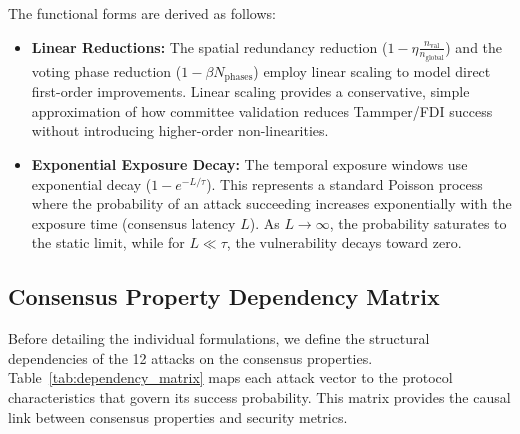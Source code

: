 \documentclass[10pt,twocolumn,journal]{IEEEtran}
\begin{document}
The functional forms are derived as follows:
\begin{itemize}[leftmargin=*]
    \item \textbf{Linear Reductions:} The spatial redundancy reduction ($1 - \eta \frac{n_{\mathrm{val}}}{n_{\mathrm{global}}}$) and the voting phase reduction ($1 - \beta N_{\mathrm{phases}}$) employ linear scaling to model direct first-order improvements. Linear scaling provides a conservative, simple approximation of how committee validation reduces Tammper/FDI success without introducing higher-order non-linearities.
    \item \textbf{Exponential Exposure Decay:} The temporal exposure windows use exponential decay ($1 - e^{-L/\tau}$). This represents a standard Poisson process where the probability of an attack succeeding increases exponentially with the exposure time (consensus latency $L$). As $L \to \infty$, the probability saturates to the static limit, while for $L \ll \tau$, the vulnerability decays toward zero.
\end{itemize}

\subsection{Consensus Property Dependency Matrix}
\label{sec:dependency_matrix}

Before detailing the individual formulations, we define the structural dependencies of the 12 attacks on the consensus properties. Table~\ref{tab:dependency_matrix} maps each attack vector to the protocol characteristics that govern its success probability. This matrix provides the causal link between consensus properties and security metrics.
\end{document}
